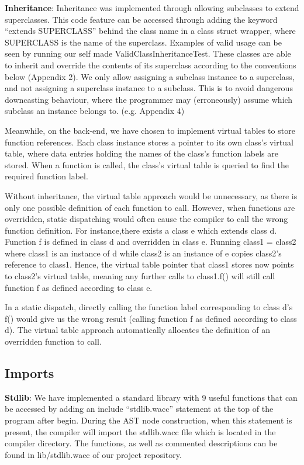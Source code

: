 \documentclass[11pt,a4paper]{article}
\begin{document}
\noindent \textbf{Inheritance}: Inheritance was implemented through allowing subclasses to extend superclasses. This code feature can be accessed through adding the keyword “extends SUPERCLASS” behind the class name in a class struct wrapper, where SUPERCLASS is the name of the superclass. Examples of valid usage can be seen by running our self made ValidClassInheritanceTest.
These classes are able to inherit and override the contents of its superclass according to the conventions below (Appendix 2). We only allow assigning a subclass instance to a superclass, and not assigning a superclass instance to a subclass. This is to avoid dangerous downcasting behaviour, where the programmer may (erroneously) assume which subclass an instance belongs to. (e.g. Appendix 4)

Meanwhile, on the back-end, we have chosen to implement virtual tables to store function references. Each class instance stores a pointer to its own class’s virtual table, where data entries holding the names of the class’s function labels are stored. When a function is called, the class’s virtual table is queried to find the required function label. 

Without inheritance, the virtual table approach would be unnecessary, as there is only one possible definition of each function to call. However, when functions are overridden, static dispatching would often cause the compiler to call the wrong function definition. For instance,there exists a class e which extends class d. Function f is defined in class d and overridden in class e. Running class1 = class2 where class1 is an instance of d while class2 is an instance of e copies class2’s reference to class1. Hence, the virtual table pointer that class1 stores now points to class2’s virtual table, meaning any further calls to class1.f() will still call function f as defined according to class e. 

In a static dispatch, directly calling the function label corresponding to class d’s f() would give us the wrong result (calling function f as defined according to class d). The virtual table approach automatically allocates the definition of an overridden function to call. 

\subsection{Imports}
\noindent \textbf{Stdlib}: We have implemented a standard library with 9 useful functions that can be accessed by adding an include “stdlib.wacc” statement at the top of the program after begin. During the AST node construction, when this statement is present, the compiler will import the stdlib.wacc file which is located in the compiler directory. The functions, as well as commented descriptions can be found in lib/stdlib.wacc of our project repository.
\end{document}
